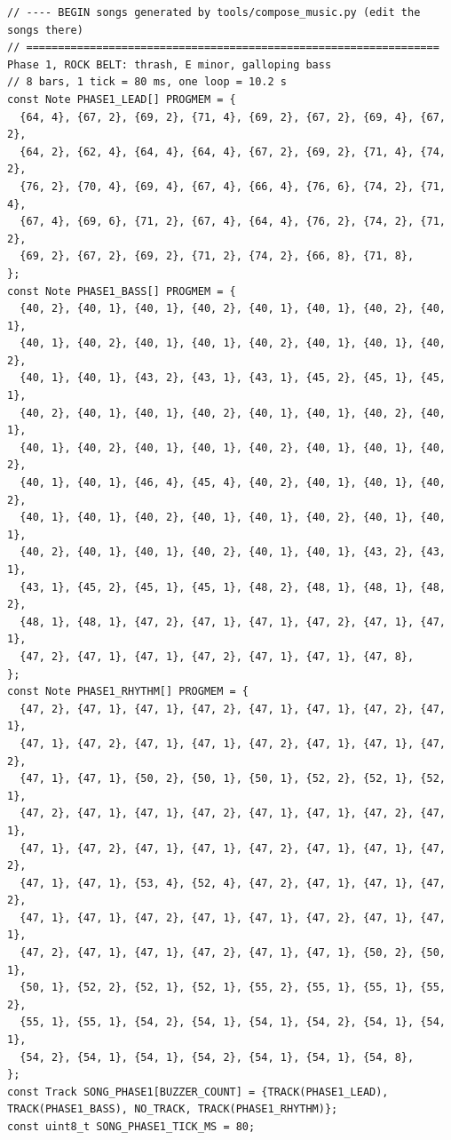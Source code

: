 \documentclass[11pt,a4paper]{article}
\begin{document}
\begin{lstlisting}[language=Arduino]
// ---- BEGIN songs generated by tools/compose_music.py (edit the songs there)
// ================================================================= Phase 1, ROCK BELT: thrash, E minor, galloping bass
// 8 bars, 1 tick = 80 ms, one loop = 10.2 s
const Note PHASE1_LEAD[] PROGMEM = {
  {64, 4}, {67, 2}, {69, 2}, {71, 4}, {69, 2}, {67, 2}, {69, 4}, {67, 2},
  {64, 2}, {62, 4}, {64, 4}, {64, 4}, {67, 2}, {69, 2}, {71, 4}, {74, 2},
  {76, 2}, {70, 4}, {69, 4}, {67, 4}, {66, 4}, {76, 6}, {74, 2}, {71, 4},
  {67, 4}, {69, 6}, {71, 2}, {67, 4}, {64, 4}, {76, 2}, {74, 2}, {71, 2},
  {69, 2}, {67, 2}, {69, 2}, {71, 2}, {74, 2}, {66, 8}, {71, 8},
};
const Note PHASE1_BASS[] PROGMEM = {
  {40, 2}, {40, 1}, {40, 1}, {40, 2}, {40, 1}, {40, 1}, {40, 2}, {40, 1},
  {40, 1}, {40, 2}, {40, 1}, {40, 1}, {40, 2}, {40, 1}, {40, 1}, {40, 2},
  {40, 1}, {40, 1}, {43, 2}, {43, 1}, {43, 1}, {45, 2}, {45, 1}, {45, 1},
  {40, 2}, {40, 1}, {40, 1}, {40, 2}, {40, 1}, {40, 1}, {40, 2}, {40, 1},
  {40, 1}, {40, 2}, {40, 1}, {40, 1}, {40, 2}, {40, 1}, {40, 1}, {40, 2},
  {40, 1}, {40, 1}, {46, 4}, {45, 4}, {40, 2}, {40, 1}, {40, 1}, {40, 2},
  {40, 1}, {40, 1}, {40, 2}, {40, 1}, {40, 1}, {40, 2}, {40, 1}, {40, 1},
  {40, 2}, {40, 1}, {40, 1}, {40, 2}, {40, 1}, {40, 1}, {43, 2}, {43, 1},
  {43, 1}, {45, 2}, {45, 1}, {45, 1}, {48, 2}, {48, 1}, {48, 1}, {48, 2},
  {48, 1}, {48, 1}, {47, 2}, {47, 1}, {47, 1}, {47, 2}, {47, 1}, {47, 1},
  {47, 2}, {47, 1}, {47, 1}, {47, 2}, {47, 1}, {47, 1}, {47, 8},
};
const Note PHASE1_RHYTHM[] PROGMEM = {
  {47, 2}, {47, 1}, {47, 1}, {47, 2}, {47, 1}, {47, 1}, {47, 2}, {47, 1},
  {47, 1}, {47, 2}, {47, 1}, {47, 1}, {47, 2}, {47, 1}, {47, 1}, {47, 2},
  {47, 1}, {47, 1}, {50, 2}, {50, 1}, {50, 1}, {52, 2}, {52, 1}, {52, 1},
  {47, 2}, {47, 1}, {47, 1}, {47, 2}, {47, 1}, {47, 1}, {47, 2}, {47, 1},
  {47, 1}, {47, 2}, {47, 1}, {47, 1}, {47, 2}, {47, 1}, {47, 1}, {47, 2},
  {47, 1}, {47, 1}, {53, 4}, {52, 4}, {47, 2}, {47, 1}, {47, 1}, {47, 2},
  {47, 1}, {47, 1}, {47, 2}, {47, 1}, {47, 1}, {47, 2}, {47, 1}, {47, 1},
  {47, 2}, {47, 1}, {47, 1}, {47, 2}, {47, 1}, {47, 1}, {50, 2}, {50, 1},
  {50, 1}, {52, 2}, {52, 1}, {52, 1}, {55, 2}, {55, 1}, {55, 1}, {55, 2},
  {55, 1}, {55, 1}, {54, 2}, {54, 1}, {54, 1}, {54, 2}, {54, 1}, {54, 1},
  {54, 2}, {54, 1}, {54, 1}, {54, 2}, {54, 1}, {54, 1}, {54, 8},
};
const Track SONG_PHASE1[BUZZER_COUNT] = {TRACK(PHASE1_LEAD), TRACK(PHASE1_BASS), NO_TRACK, TRACK(PHASE1_RHYTHM)};
const uint8_t SONG_PHASE1_TICK_MS = 80;


\end{lstlisting}
\end{document}
